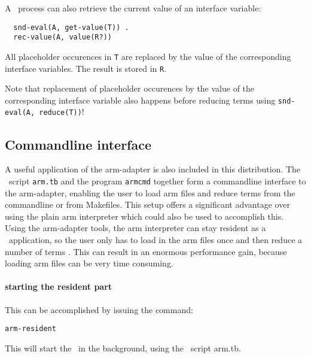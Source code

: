 A \TB\ process can also retrieve the current value of an interface variable:

\begin{verbatim}
  snd-eval(A, get-value(T)) .
  rec-value(A, value(R?))
\end{verbatim}

All placeholder occurences in {\tt T} are replaced by the value
of the corresponding interface variables. The result is stored in {\tt R}.

Note that replacement of placeholder occurences by the value of the
corresponding interface variable also happens before reducing terms
using {\tt snd-eval(A, reduce(T))}!

\subsection{Commandline interface}

A useful application of the arm-adapter is also included in this
distribution. The \TB\ script {\tt arm.tb} and the program {\tt armcmd}
together form a commandline interface to the arm-adapter, enabling
the user to load arm files and reduce terms from the commandline
or from Makefiles. This setup offers a significant advantage over using
the plain arm interpreter which could also be used to accomplish this.
Using the arm-adapter tools, the arm interpreter can stay resident as
a \TB\ application, so the user only has to load in the arm files once
and then reduce a number of terms .
This can result in an enormous performance gain, because loading arm files
can be very time consuming.

\paragraph{starting the resident part} This can be
accomplished by issuing the command:
\begin{verbatim}
arm-resident
\end{verbatim}
This will start the \TB\ in the background, using the \TB\ script arm.tb.

